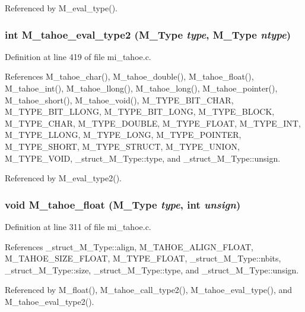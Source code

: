 Referenced by M\_\-eval\_\-type().
\subsubsection{\setlength{\rightskip}{0pt plus 5cm}int M\_\-tahoe\_\-eval\_\-type2 (\bf{M\_\-Type} {\em type}, \bf{M\_\-Type} {\em ntype})}\label{mi__tahoe_8c_2f106a7d6fd7ae02a53d7383812ac777}




Definition at line 419 of file mi\_\-tahoe.c.

References M\_\-tahoe\_\-char(), M\_\-tahoe\_\-double(), M\_\-tahoe\_\-float(), M\_\-tahoe\_\-int(), M\_\-tahoe\_\-llong(), M\_\-tahoe\_\-long(), M\_\-tahoe\_\-pointer(), M\_\-tahoe\_\-short(), M\_\-tahoe\_\-void(), M\_\-TYPE\_\-BIT\_\-CHAR, M\_\-TYPE\_\-BIT\_\-LLONG, M\_\-TYPE\_\-BIT\_\-LONG, M\_\-TYPE\_\-BLOCK, M\_\-TYPE\_\-CHAR, M\_\-TYPE\_\-DOUBLE, M\_\-TYPE\_\-FLOAT, M\_\-TYPE\_\-INT, M\_\-TYPE\_\-LLONG, M\_\-TYPE\_\-LONG, M\_\-TYPE\_\-POINTER, M\_\-TYPE\_\-SHORT, M\_\-TYPE\_\-STRUCT, M\_\-TYPE\_\-UNION, M\_\-TYPE\_\-VOID, \_\-struct\_\-M\_\-Type::type, and \_\-struct\_\-M\_\-Type::unsign.

Referenced by M\_\-eval\_\-type2().
\subsubsection{\setlength{\rightskip}{0pt plus 5cm}void M\_\-tahoe\_\-float (\bf{M\_\-Type} {\em type}, int {\em unsign})}\label{mi__tahoe_8c_9ef6b573f0c7641723ecce3ff69f0c27}




Definition at line 311 of file mi\_\-tahoe.c.

References \_\-struct\_\-M\_\-Type::align, M\_\-TAHOE\_\-ALIGN\_\-FLOAT, M\_\-TAHOE\_\-SIZE\_\-FLOAT, M\_\-TYPE\_\-FLOAT, \_\-struct\_\-M\_\-Type::nbits, \_\-struct\_\-M\_\-Type::size, \_\-struct\_\-M\_\-Type::type, and \_\-struct\_\-M\_\-Type::unsign.

Referenced by M\_\-float(), M\_\-tahoe\_\-call\_\-type2(), M\_\-tahoe\_\-eval\_\-type(), and M\_\-tahoe\_\-eval\_\-type2().
